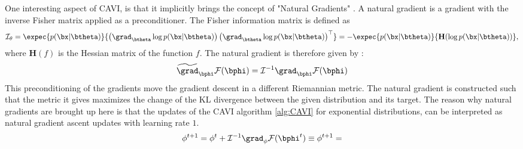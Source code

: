 One interesting aspect of \ac{CAVI}, is that it implicitly brings the concept of "Natural Gradients" \cite{amariNaturalGradientWorks1998}.
A natural gradient is a gradient with the inverse Fisher matrix applied as a preconditioner.
The Fisher information matrix is defined as 
\begin{align*}
    \mathcal{I}_\theta = \expec{p(\bx|\btheta)}{\left(\grad_{\btheta}\log p(\bx|\btheta)\right)\left(\grad_{\btheta} \log p(\bx|\btheta)\right)^\top} = -\expec{p(\bx|\btheta)}{\mathbf{H}(\log p(\bx|\btheta))},
\end{align*}
where $\mathbf{H}(f)$ is the Hessian matrix of the function $f$.
The natural gradient is therefore given by :
\begin{align*}
    \widetilde{\grad}_{\bphi}\mathcal{F}(\bphi) = \mathcal{I}^{-1} \grad_{\bphi}\mathcal{F}(\bphi)
\end{align*}
This preconditioning of the gradients move the gradient descent in a different Riemannian metric.
The natural gradient is constructed such that the metric it gives maximizes the change of the \ac{KL} divergence between the given distribution and its target.
The reason why natural gradients are brought up here is that the updates of the \ac{CAVI} algorithm \ref{alg:CAVI} for exponential distributions, can be interpreted as natural gradient ascent updates with learning rate $1$.
\begin{align*}
    \phi^{t+1} = \phi^t + \mathcal{I}^{-1}\grad_{\phi}\mathcal{F}(\bphi^t) \equiv \phi^{t+1} = 
\end{align*}



